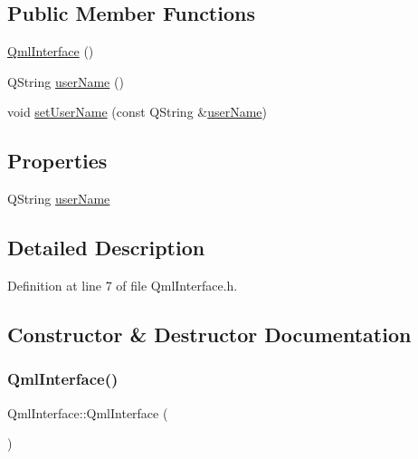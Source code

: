 \subsection*{Public Member Functions}
\begin{DoxyCompactItemize}
\item 
\hyperlink{class_qml_interface_a4fcfe1f5b0ffd211526da9479836f4bb}{Qml\+Interface} ()
\item 
Q\+String \hyperlink{class_qml_interface_aec25299986ea1222d2bf1c358c92defc}{user\+Name} ()
\item 
void \hyperlink{class_qml_interface_a29e94fd20544d125c169c3e023e45c97}{set\+User\+Name} (const Q\+String \&\hyperlink{class_qml_interface_a3a24523a9f712669415a6719d423d665}{user\+Name})
\end{DoxyCompactItemize}
\subsection*{Properties}
\begin{DoxyCompactItemize}
\item 
Q\+String \hyperlink{class_qml_interface_a3a24523a9f712669415a6719d423d665}{user\+Name}
\end{DoxyCompactItemize}


\subsection{Detailed Description}


Definition at line 7 of file Qml\+Interface.\+h.



\subsection{Constructor \& Destructor Documentation}
\mbox{\label{class_qml_interface_a4fcfe1f5b0ffd211526da9479836f4bb}} 
\subsubsection{\texorpdfstring{Qml\+Interface()}{QmlInterface()}}
{\footnotesize\ttfamily Qml\+Interface\+::\+Qml\+Interface (\begin{DoxyParamCaption}{ }\end{DoxyParamCaption})\hspace{0.3cm}{\ttfamily [explicit]}}



